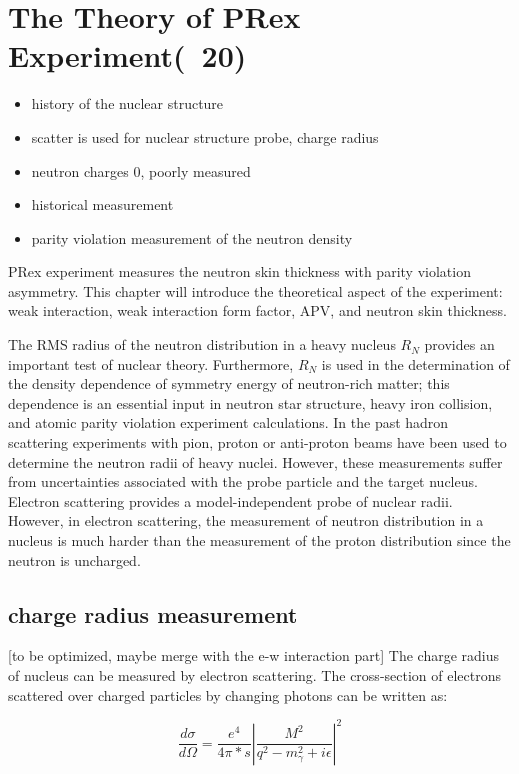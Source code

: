 \chapter{The Theory of PRex Experiment(~20)}

\begin{itemize}
    \item history of the nuclear structure
    \item scatter is used for nuclear structure probe, charge radius 
    \item neutron charges 0, poorly measured
    \item historical measurement 
    \item parity violation measurement of the neutron density
\end{itemize}

PRex experiment measures the neutron skin thickness with parity violation asymmetry. This chapter will introduce the theoretical aspect of the experiment: weak interaction, weak interaction form factor, APV, and neutron skin thickness.

The RMS radius of the  neutron distribution in a heavy nucleus  $R_N$ provides an important test of nuclear theory. Furthermore,   $R_N$ is used in the determination of  the density dependence of symmetry energy of neutron-rich matter; this dependence is an  essential input in   neutron star structure, heavy iron collision, and atomic parity violation experiment calculations. In the past hadron scattering experiments with pion, proton or anti-proton beams have been used to determine the neutron radii of heavy nuclei. However, these measurements suffer from uncertainties associated with the probe particle and the target nucleus. Electron scattering provides a model-independent probe of nuclear radii.  However, in electron scattering, the measurement of neutron distribution in a nucleus  is much harder than the measurement of the proton distribution  since the neutron is uncharged. 

\section{charge radius measurement}
[to be optimized, maybe merge with the e-w interaction part]
The charge radius of nucleus can be measured by electron scattering. The cross-section of electrons scattered over charged particles by changing photons can be written as:

\begin{equation}
    \frac{d\sigma}{d\Omega} = \frac{e^4}{4\pi*s}|\frac{M^2}{q^2 - m^2_\gamma + i\epsilon}|^2
\end{equation}

